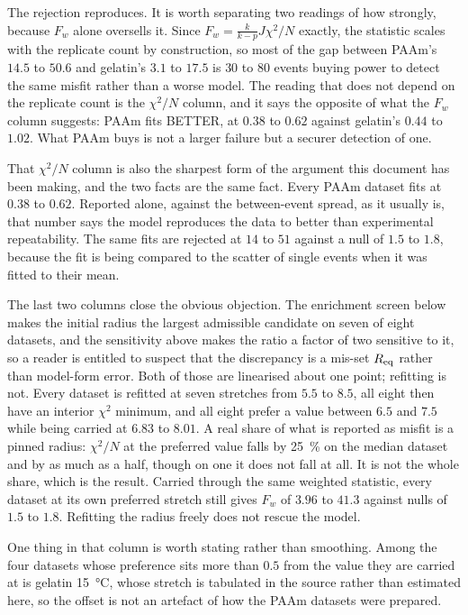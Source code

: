 \documentclass[10pt]{article}
\begin{document}
The rejection reproduces. It is worth separating two readings of how strongly, because $F_w$
alone oversells it. Since $F_w = \tfrac{k}{k-p}J\chi^2/N$ exactly, the statistic scales with the
replicate count by construction, so most of the gap between PAAm's $14.5$ to $50.6$ and gelatin's
$3.1$ to $17.5$ is $30$ to $80$ events buying power to detect the same misfit rather than a worse
model. The reading that does not depend on the replicate count is the $\chi^2/N$ column, and it
says the opposite of what the $F_w$ column suggests: PAAm fits BETTER, at $0.38$ to $0.62$
against gelatin's $0.44$ to $1.02$. What PAAm buys is not a larger failure but a securer
detection of one.

That $\chi^2/N$ column is also the sharpest form of the argument this document has been making,
and the two facts are the same fact. Every PAAm dataset fits at $0.38$ to $0.62$. Reported alone,
against the between-event spread, as it usually is, that number says the model reproduces the
data to better than experimental repeatability. The same fits are rejected at $14$ to $51$
against a null of $1.5$ to $1.8$, because the fit is being compared to the scatter of single
events when it was fitted to their mean.

The last two columns close the obvious objection. The enrichment screen below makes the
initial radius the largest admissible candidate on seven of eight datasets, and the sensitivity
above makes the ratio a factor of two sensitive to it, so a reader is entitled to suspect that
the discrepancy is a mis-set $R_{\rm eq}$ rather than model-form error. Both of those are
linearised about one point; refitting is not. Every dataset is refitted at seven stretches from
$5.5$ to $8.5$, all eight then have an interior $\chi^2$ minimum, and all eight prefer a value
between $6.5$ and $7.5$ while being carried at $6.83$ to $8.01$. A real share of what is
reported as misfit is a pinned radius: $\chi^2/N$ at the preferred value falls by \SI{25}{\percent}
on the median dataset and by as much as a half, though on one it does not fall at all. It is not
the whole share, which is the result. Carried through the same weighted statistic, every dataset
at its own preferred stretch still gives $F_w$ of $3.96$ to $41.3$ against nulls of $1.5$ to
$1.8$. Refitting the radius freely does not rescue the model.

One thing in that column is worth stating rather than smoothing. Among the four datasets whose
preference sits more than $0.5$ from the value they are carried at is gelatin \SI{15}{\celsius},
whose stretch is tabulated in the source rather than estimated here, so the offset is not an
artefact of how the PAAm datasets were prepared.
\end{document}
